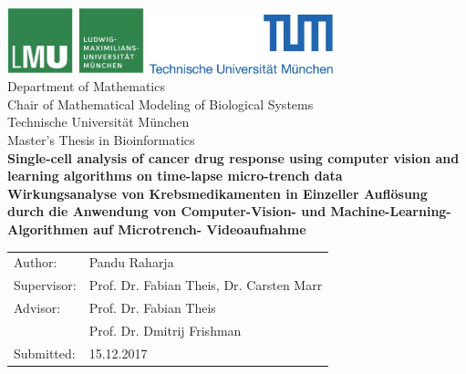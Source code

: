 \documentclass[pdftex,12pt,a4paper]{report}
\begin{document}
\begin{titlepage}
{\sffamily


\begin{center}
\includegraphics[width=0.3\textwidth]{logo2.jpg}
\hfill
\includegraphics[width=0.4\textwidth]{logo1.jpg}  
\\[1.5cm]  

{\Large Department of Mathematics}\\[0.5cm]
{\Large Chair of Mathematical Modeling of Biological Systems}\\[0.5cm]
{Technische Universit\"at M\"unchen}\\[1cm]

{\Large Master's Thesis in Bioinformatics}\\[2cm]
{\textbf{\Large Single-cell analysis of cancer drug response using computer vision and learning algorithms on time-lapse micro-trench data}}\\[2cm]
{\textbf{\Large Wirkungsanalyse von Krebsmedikamenten in Einzeller Aufl\"osung durch die Anwendung von Computer-Vision- und Machine-Learning-Algorithmen auf Microtrench- Videoaufnahme}}\\[4cm]

\end{center}
\begin{center}\Large
  \begin{tabular}{ll}
    Author:& Pandu Raharja\\
    Supervisor: &  Prof. Dr. Fabian Theis, Dr. Carsten Marr\\
    Advisor:        &  Prof. Dr. Fabian Theis\\
    & Prof. Dr. Dmitrij Frishman\\
    Submitted:     &  15.12.2017
  \end{tabular}
\end{center}

}%

\end{titlepage}


\end{document}
